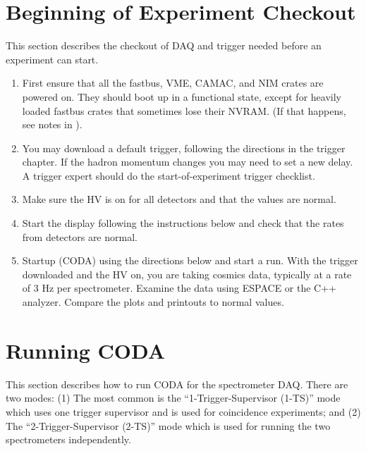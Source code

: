 {\section{Beginning of Experiment Checkout}

\par
This section describes the 
checkout of DAQ and trigger
needed before an experiment can start.

\begin{enumerate}
\item{First ensure that all the fastbus, VME,
CAMAC, and NIM crates are powered
on. They should
boot up in a functional state, except for
heavily loaded fastbus crates that sometimes
lose their NVRAM.  (If that happens, see notes
in ).}

\item{You may download
a default trigger, following the directions in
the trigger chapter.  If the hadron momentum changes
you may need to set a new delay.  A trigger expert
should do the start-of-experiment
trigger checklist.}

\item{Make sure the HV is on for all detectors
and that the values are normal.}

\item{Start the 
display following the instructions below and
check that the rates from detectors are normal.}
 
\item{Startup  (CODA) using the directions below
and start a run.  With the trigger downloaded
and the HV on, you are taking cosmics data, typically at 
a rate of 3 Hz per spectrometer.  
Examine the data using ESPACE or the C++ analyzer.
Compare the plots and printouts to normal values.}

\end{enumerate}

\section{Running CODA}

\par
This section describes how to run CODA for
the spectrometer DAQ.  There are two modes:
(1) The most common is the ``1-Trigger-Supervisor (1-TS)''
mode which uses one trigger supervisor and
is used for coincidence experiments; and
(2) The ``2-Trigger-Supervisor (2-TS)'' mode which
is used for running the two spectrometers
independently.

}
